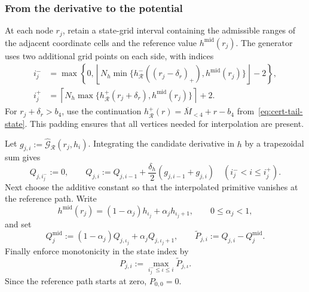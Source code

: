 \documentclass[11pt]{article}
\theoremstyle{definition}
\theoremstyle{remark}
\begin{document}
\subsubsection{From the derivative to the potential}

At each node $r_j$, retain a state-grid interval containing the
admissible ranges of the adjacent coordinate cells and the reference
value $h^{\mathrm{mid}}(r_j)$.  The generator uses two additional grid
points on each side, with indices
\begin{align*}
 i_j^-&=\max\left\{0,
 \left\lfloor N_h\min\{h^-_{\mathcal R}((r_j-\delta_r)_+),
                          h^{\mathrm{mid}}(r_j)\}\right\rfloor-2\right\},\\
 i_j^+&=\left\lceil N_h\max\{h^+_{\mathcal R}(r_j+\delta_r),
                              h^{\mathrm{mid}}(r_j)\}\right\rceil+2.
\end{align*}
For $r_j+\delta_r>b_4$, use the continuation
$h^+_{\mathcal R}(r)=\overline M_{<4}+r-b_4$
from~\eqref{eq:cert-tail-state}.  This padding ensures that all vertices
needed for interpolation are present.

Let $g_{j,i}:=\widehat{\mathcal G}_{\mathcal R}(r_j,h_i)$.
Integrating the candidate derivative in $h$ by a trapezoidal sum gives
\begin{equation}\label{eq:cert-potential-trapezoid}
 Q_{j,i_j^-}:=0,\qquad
 Q_{j,i}:=Q_{j,i-1}
       +\frac{\delta_h}{2}(g_{j,i-1}+g_{j,i})
 \quad(i_j^-<i\le i_j^+).
\end{equation}
Next choose the additive constant so that the interpolated primitive
vanishes at the reference path.  Write
\[
 h^{\mathrm{mid}}(r_j)
 =(1-\alpha_j)h_{\iota_j}+\alpha_jh_{\iota_j+1},
 \qquad 0\le\alpha_j<1,
\]
and set
\begin{equation}\label{eq:cert-potential-offset}
 Q_j^{\mathrm{mid}}:=(1-\alpha_j)Q_{j,\iota_j}
                    +\alpha_jQ_{j,\iota_j+1},\qquad
 \widetilde P_{j,i}:=Q_{j,i}-Q_j^{\mathrm{mid}}.
\end{equation}
Finally enforce monotonicity in the state index by
\begin{equation}\label{eq:cert-potential-vertices}
 P_{j,i}:=\max_{i_j^-\le\iota\le i}\widetilde P_{j,\iota}.
\end{equation}
Since the reference path starts at zero, $P_{0,0}=0$.
\end{document}
